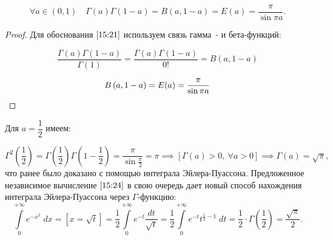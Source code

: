 \documentclass[../../main.tex]{subfiles}
\begin{document}
	
\begin{corollary*}
	\begin{equation}
	\label{15:21}
	\forall a \in (0,1) \quad \Gamma(a)\Gamma \left( 1-a\right)  = B\left( 
	a,1-a\right) = E(a) = \frac{\pi}{\sin{\pi a}}.
	\end{equation}
\end{corollary*}


\begin{proof}
	Для обоснования $\eqref{15:21}$ используем связь гамма\!~- и бета-функций:
	
	\begin{equation}
	\label{15:22}
	\frac{\Gamma \left( a\right)\Gamma \left( 1-a\right)}{\Gamma \left( 1\right)} 
	= \frac{\Gamma \left( a\right)\Gamma \left( 1-a\right)}{0!} = B \left( 
	a,1-a\right)
	\end{equation}
	
	\begin{equation}
	\label{15:23}
	B \left( a,1-a\right) = E(a) = \frac{\pi}{\sin{\pi a}}
	\qedhere
	\end{equation}
\end{proof}	

Для $a = \dfrac{1}{2}$ имеем:

\begin{equation}
\label{15:24}
\Gamma^2 \left( \frac{1}{2} \right) = \Gamma \left( \frac{1}{2} \right) \Gamma 
\left( 1-\frac{1}{2} \right) = \frac{\pi}{\sin{\frac{\pi}{2}}} = \pi \implies 
\left[ \Gamma(a) > 0,\ \forall a > 0\right] \implies \Gamma(a) = \sqrt{\pi},
\end{equation}
что ранее было доказано с помощью интеграла Эйлера-Пуассона. Предложенное 
независимое вычисление $\eqref{15:24}$ в свою очередь дает новый способ 
нахождения интеграла Эйлера-Пуассона через $\Gamma$-функцию:
\[  \int\limits_{0}^{+\infty} e^{-x^2} \; dx = \left[ x = \sqrt{t} \right] =  
\frac{1}{2} \int\limits_{0}^{+\infty} e^{-t} \frac{dt}{\sqrt{t}} = \frac{1}{2} 
\int\limits_{0}^{+\infty} e^{-t} t^{\frac{1}{2} - 1} \; dt = \frac{1}{2} \cdot 
\Gamma\left( \frac{1}{2} \right) = \frac{\sqrt{\pi}}{2}. \]
\end{document}
